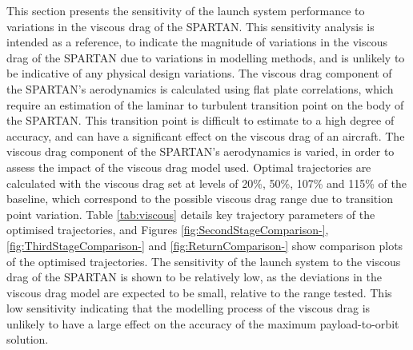 This section presents the sensitivity of the launch system performance to variations in the viscous drag of the SPARTAN. This sensitivity analysis is intended as a reference, to indicate the magnitude of variations in the viscous drag of the SPARTAN due to variations in modelling methods, and is unlikely to be indicative of any physical design variations.
The viscous drag component of the SPARTAN's aerodynamics is calculated using flat plate correlations, which require an estimation of the laminar to turbulent transition point on the body of the SPARTAN\cite{Ward2018}. This transition point is difficult to estimate to a high degree of accuracy, and can have a significant effect on the viscous drag of an aircraft\cite{Ward2018}.
The viscous drag component of the SPARTAN's aerodynamics is varied, in order to assess the impact of the viscous drag model used. Optimal trajectories are calculated with the viscous drag set at levels of 20\%, 50\%, 107\% and 115\% of the baseline, which correspond to the possible viscous drag range due to transition point variation. Table \ref{tab:viscous} details key trajectory parameters of the optimised trajectories, and Figures \ref{fig:SecondStageComparison-}, \ref{fig:ThirdStageComparison-} and \ref{fig:ReturnComparison-} show comparison plots of the optimised trajectories. The sensitivity of the launch system to the viscous drag of the SPARTAN is shown to be relatively low, as the deviations in the viscous drag model are expected to be small, relative to the range tested. This low sensitivity indicating that the modelling process of the viscous drag is unlikely to have a large effect on the accuracy of the maximum payload-to-orbit solution.

